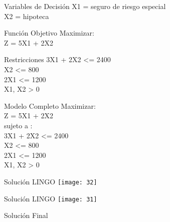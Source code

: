 \documentclass{beamer}
\begin{document}
\begin{frame}[fragile]{Variables de Decisión}
X1 = seguro de riesgo especial\\
X2 = hipoteca\\

\end{frame}

\begin{frame}[fragile]{Función Objetivo}
Maximizar:\\
Z = 5X1 + 2X2

\end{frame}

\begin{frame}[fragile]{Restricciones}
3X1 + 2X2 <= 2400\\
X2 <= 800\\
2X1 <= 1200\\
X1, X2 > 0\\

\end{frame}

\begin{frame}[fragile]{Modelo Completo}
Maximizar:\\
Z = 5X1 + 2X2\\

sujeto a :\\
3X1 + 2X2 <= 2400\\
X2 <= 800\\
2X1 <= 1200\\
X1, X2 > 0\\

\end{frame}
\begin{frame}[fragile]{Solución LINGO}
    \texttt{[image: 32]}
\end{frame}
\begin{frame}[fragile]{Solución LINGO}
    \texttt{[image: 31]}
\end{frame}

\begin{frame}[fragile]{Solución Final}
\end{frame}
\end{document}
